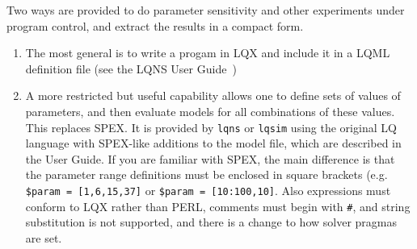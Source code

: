 \documentclass[11pt]{article}
\begin{document}
Two ways are provided to do parameter sensitivity and other experiments under program
control, and extract the results in a compact form.
\begin{enumerate}
\item The most general is to write a progam in LQX and include it in a LQML definition file (see the
  LQNS User Guide~\cite{MANUAL:lqns})
\item A more restricted but useful capability allows one to define sets of values of parameters, and then
  evaluate models for all combinations of these values. This replaces SPEX. It is provided by \texttt{lqns}
  or \texttt{lqsim} using the original LQ language with SPEX-like additions to the model file, which are
  described in the User Guide. If you are familiar with SPEX, the main difference is that the
  parameter range definitions must be enclosed in square brackets (e.g. \verb!$param = [1,6,15,37]! or
  \verb!$param = [10:100,10]!. Also expressions must conform to LQX rather than PERL, comments must
  begin with \verb!#!, and string substitution is not supported, and there is a change to how solver pragmas
  are set.


\end{enumerate}
\end{document}
